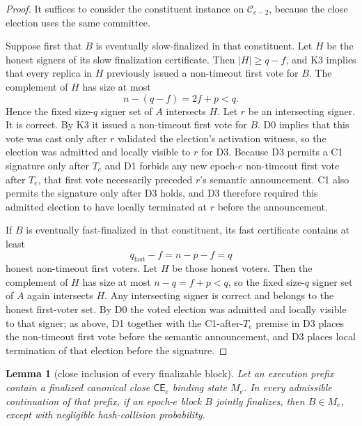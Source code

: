 \documentclass[11pt]{article}
\newtheorem{lemma}[theorem]{Lemma}
\theoremstyle{definition}
\theoremstyle{remark}
\newcommand{\C}{\mathcal C}
\newcommand{\CE}{\mathsf{CE}}
\begin{document}
\begin{proof}
It suffices to consider the constituent instance on $\C_{e-2}$, because the close election uses the same committee.

Suppose first that $B$ is eventually slow-finalized in that constituent. Let $H$ be the honest signers of its slow finalization certificate. Then $|H|\ge q-f$, and K3 implies that every replica in $H$ previously issued a non-timeout first vote for $B$. The complement of $H$ has size at most
\[
  n-(q-f)=2f+p<q.
\]
Hence the fixed size-$q$ signer set of $A$ intersects $H$. Let $r$ be an intersecting signer. It is correct. By K3 it issued a non-timeout first vote for $B$. D0 implies that this vote was cast only after $r$ validated the election's activation witness, so the election was admitted and locally visible to $r$ for D3. Because D3 permits a C1 signature only after $T_e$ and D1 forbids any new epoch-$e$ non-timeout first vote after $T_e$, that first vote necessarily preceded $r$'s semantic announcement. C1 also permits the signature only after D3 holds, and D3 therefore required this admitted election to have locally terminated at $r$ before the announcement.

If $B$ is eventually fast-finalized in that constituent, its fast certificate contains at least
\[
  q_{\mathrm{fast}}-f=n-p-f=q
\]
honest non-timeout first voters. Let $H$ be those honest voters. Then the complement of $H$ has size at most $n-q=f+p<q$, so the fixed size-$q$ signer set of $A$ again intersects $H$. Any intersecting signer is correct and belongs to the honest first-voter set. By D0 the voted election was admitted and locally visible to that signer; as above, D1 together with the C1-after-$T_e$ premise in D3 places the non-timeout first vote before the semantic announcement, and D3 places local termination of that election before the signature.
\end{proof}

\begin{lemma}[close inclusion of every finalizable block]
\label{lem:close-inclusion}
Let an execution prefix contain a finalized canonical close $\CE_e$ binding state $M_e$. In every admissible continuation of that prefix, if an epoch-$e$ block $B$ jointly finalizes, then $B\in M_e$, except with negligible hash-collision probability.
\end{lemma}
\end{document}
